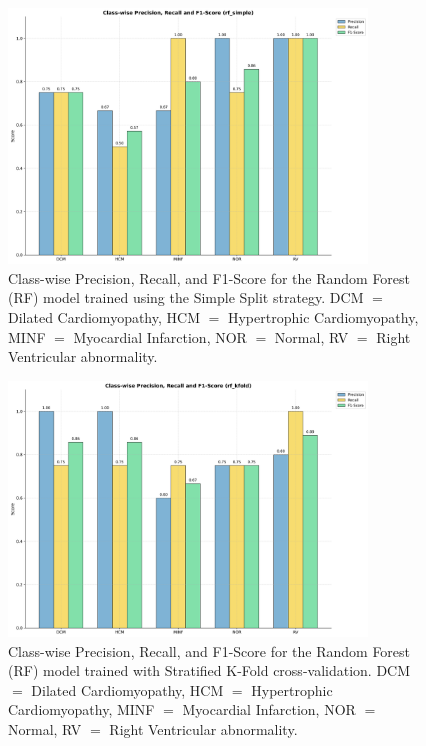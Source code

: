\begin{figure}
	\begin{center}
		\includegraphics[width=0.85\textwidth]{../images/metrics/rf/rf_simple_class_wise_metrics.png}
	\end{center}
	\caption{Class-wise Precision, Recall, and F1-Score for the Random Forest
		(RF) model trained using the Simple Split strategy. DCM $=$ Dilated
		Cardiomyopathy, HCM $=$ Hypertrophic Cardiomyopathy, MINF $=$ Myocardial
		Infarction, NOR $=$ Normal, RV $=$ Right Ventricular abnormality.}
\end{figure}

\begin{figure}
	\begin{center}
		\includegraphics[width=0.85\textwidth]{../images/metrics/rf/rf_kfold_class_wise_metrics.png}
	\end{center}
	\caption{Class-wise Precision, Recall, and F1-Score for the Random Forest
		(RF) model trained with Stratified K-Fold cross-validation. DCM $=$ Dilated
		Cardiomyopathy, HCM $=$ Hypertrophic Cardiomyopathy, MINF $=$ Myocardial
		Infarction, NOR $=$ Normal, RV $=$ Right Ventricular abnormality.}
\end{figure}

